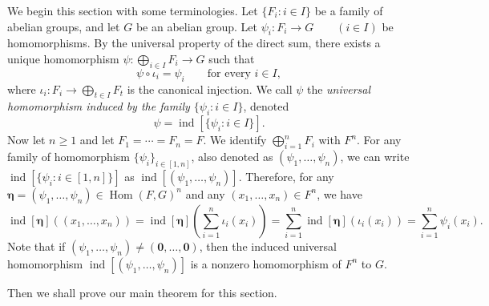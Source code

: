 \documentclass[a4paper, 12pt]{article}
\begin{document}
We begin this section with some terminologies. Let $\{F_i:i\in I\}$ be a family of abelian groups, and let $G$ be an
abelian group. Let
$\psi_i:F_i\longrightarrow G \qquad (i\in I)$
be homomorphisms. By the universal property of the direct sum, there
exists a unique homomorphism
$
  \psi:\bigoplus\limits_{i\in I}F_i\longrightarrow G
$
such that
\begin{equation}\label{equation universal map}
  \psi\circ\iota_i=\psi_i
  \qquad\text{for every }i\in I,
\end{equation}
where
$
  \iota_i:F_i\longrightarrow\bigoplus\limits_{t\in I}F_t
$
is the canonical injection. We call $\psi$ the \emph{universal
homomorphism induced by the family $\{\psi_i:i\in I\}$}, denoted
$$\psi=\operatorname{ind}[\{\psi_i:i\in I\}].$$
Now let $n\geq 1$ and let $F_1=\cdots=F_n=F$. We identify
$\bigoplus\limits_{i=1}^n F_i$ with $F^n$. For any family of homomorphism
$\{\psi_i\}_{i\in [1,n]}$, also denoted as $(\psi_1,\ldots,\psi_n)$, we can write
$\operatorname{ind}[\{\psi_i:i\in [1,n]\}]$ as $\operatorname{ind}[(\psi_1,\ldots,\psi_n)].$
Therefore, for any $\boldsymbol{\eta}=(\psi_1,\ldots,\psi_n)\in \operatorname{Hom}(F,G)^n$ and any $(x_1,\ldots,x_n)\in F^n$,
we have
\begin{equation}\label{eq:induced-explicit}
\operatorname{ind}[\boldsymbol{\eta}]\left((x_1,\ldots,x_n)\right)=\operatorname{ind}[\boldsymbol{\eta}]\left(\sum\limits_{i=1}^n \iota_i(x_i)\right)=\sum\limits_{i=1}^n  \operatorname{ind}[\boldsymbol{\eta}]\left(\iota_i(x_i)\right)=\sum\limits_{i=1}^n \psi_i(x_i).
\end{equation}
Note that if $(\psi_1,\ldots,\psi_n)\neq (\mathbf 0,\ldots,\mathbf 0)$, then the induced universal
homomorphism $\operatorname{ind}[(\psi_1,\ldots,\psi_n)]$ is a nonzero homomorphism of $F^n$ to $G$.

Then we shall prove our main theorem for this section.
\end{document}
